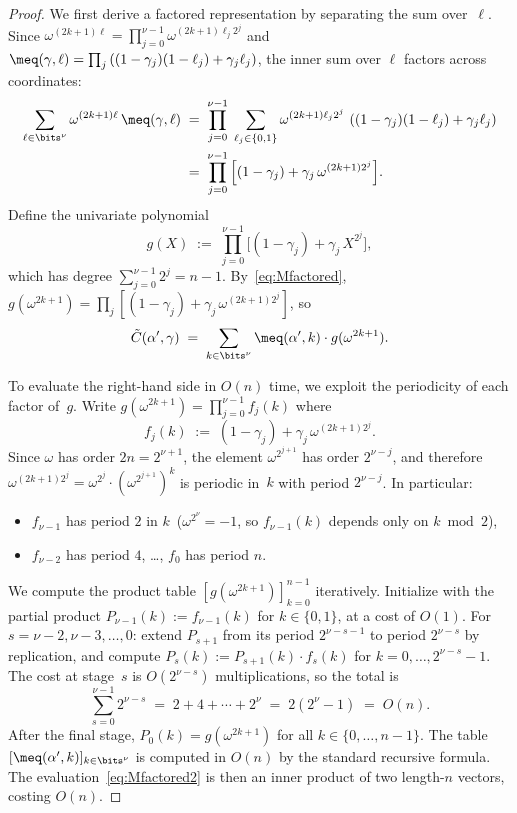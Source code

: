 \begin{proof}
    We first derive a factored representation by separating the sum over~$\ell$.
    Since $\omega^{(2k+1)\ell} = \prod_{j=0}^{\nu-1} \omega^{(2k+1)\ell_j 2^j}$
    and $\meq(\gamma,\ell) = \prod_{j} \left((1-\gamma_j)(1-\ell_j) + \gamma_j \ell_j\right)$,
    the inner sum over $\ell$ factors across coordinates:
    \begin{align}
        \sum_{\ell \in \bits^\nu} \omega^{(2k+1)\ell} \, \meq(\gamma,\ell)
        &\;=\; \prod_{j=0}^{\nu-1}\; \sum_{\ell_j \in \{0,1\}} \omega^{(2k+1)\ell_j 2^j}\, \left((1-\gamma_j)(1-\ell_j) + \gamma_j \ell_j\right) \notag \\
        &\;=\; \prod_{j=0}^{\nu-1} \Big[(1-\gamma_j) + \gamma_j\, \omega^{(2k+1)2^j}\Big]. \label{eq:Mfactored}
    \end{align}
    Define the univariate polynomial
    \[
        g(X) \;:=\; \prod_{j=0}^{\nu-1} \Big[(1-\gamma_j) + \gamma_j\, X^{2^j}\Big],
    \]
    which has degree $\sum_{j=0}^{\nu-1} 2^j = n - 1$. By~\eqref{eq:Mfactored}, $g(\omega^{2k+1}) = \prod_j [(1-\gamma_j) + \gamma_j\, \omega^{(2k+1)2^j}]$, so
    \begin{equation}\label{eq:Mfactored2}
        \tilde{C}(\alpha', \gamma) \;=\; \sum_{k \in \bits^\nu} \meq(\alpha', k)\cdot g(\omega^{2k+1}).
    \end{equation}

    To evaluate the right-hand side in $O(n)$ time, we exploit the periodicity of each factor of~$g$.
    Write $g(\omega^{2k+1}) = \prod_{j=0}^{\nu-1} f_j(k)$ where
    \[
        f_j(k) \;:=\; (1-\gamma_j) + \gamma_j\, \omega^{(2k+1)2^j}.
    \]
    Since $\omega$ has order $2n = 2^{\nu+1}$, the element $\omega^{2^{j+1}}$ has order $2^{\nu-j}$, and therefore $\omega^{(2k+1)2^j} = \omega^{2^j} \cdot (\omega^{2^{j+1}})^k$ is periodic in~$k$ with period $2^{\nu-j}$.
    In particular:
    \begin{itemize}
        \item $f_{\nu-1}$ has period $2$ in $k$ \,($\omega^{2^\nu} = -1$, so $f_{\nu-1}(k)$ depends only on $k \bmod 2$),
        \item $f_{\nu-2}$ has period $4$, \;\ldots, \; $f_0$ has period $n$.
    \end{itemize}

    We compute the product table $[g(\omega^{2k+1})]_{k=0}^{n-1}$ iteratively.
    Initialize with the partial product $P_{\nu-1}(k) := f_{\nu-1}(k)$ for $k \in \{0, 1\}$, at a cost of $O(1)$.
    For $s = \nu-2, \nu-3, \ldots, 0$: extend $P_{s+1}$ from its period $2^{\nu-s-1}$ to period $2^{\nu-s}$ by replication, and compute
    $P_s(k) := P_{s+1}(k) \cdot f_s(k)$ for $k = 0,\ldots, 2^{\nu-s}-1$.
    The cost at stage~$s$ is $O(2^{\nu-s})$ multiplications, so the total is
    \[
        \sum_{s=0}^{\nu-1} 2^{\nu-s} \;=\; 2 + 4 + \cdots + 2^\nu \;=\; 2(2^\nu - 1) \;=\; O(n).
    \]
    After the final stage, $P_0(k) = g(\omega^{2k+1})$ for all $k \in \{0,\ldots,n-1\}$.
    The table $[\meq(\alpha',k)]_{k \in \bits^\nu}$ is computed in $O(n)$ by the standard recursive formula.
    The evaluation~\eqref{eq:Mfactored2} is then an inner product of two length-$n$ vectors, costing $O(n)$.
\end{proof}